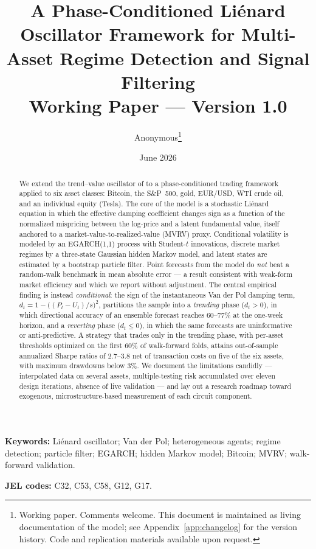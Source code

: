 \documentclass[11pt,a4paper]{article}
\title{\textbf{A Phase-Conditioned Li\'enard Oscillator Framework for Multi-Asset Regime Detection and Signal Filtering}\\[0.5em]
\large Working Paper --- Version 1.0}
\author{Anonymous\thanks{Working paper. Comments welcome. This document is maintained as living documentation of the model; see Appendix~\ref{app:changelog} for the version history. Code and replication materials available upon request.}}
\date{June 2026}
\begin{document}
\maketitle

\begin{abstract}
\noindent
We extend the trend--value oscillator of \citet{majewski2020co} to a phase-conditioned trading framework applied to six asset classes: Bitcoin, the S\&P~500, gold, EUR/USD, WTI crude oil, and an individual equity (Tesla). The core of the model is a stochastic Li\'enard equation in which the effective damping coefficient changes sign as a function of the normalized mispricing between the log-price and a latent fundamental value, itself anchored to a market-value-to-realized-value (MVRV) proxy. Conditional volatility is modeled by an EGARCH(1,1) process with Student-$t$ innovations, discrete market regimes by a three-state Gaussian hidden Markov model, and latent states are estimated by a bootstrap particle filter. Point forecasts from the model do \emph{not} beat a random-walk benchmark in mean absolute error --- a result consistent with weak-form market efficiency and which we report without adjustment. The central empirical finding is instead \emph{conditional}: the sign of the instantaneous Van der Pol damping term, $d_t = 1 - \big((P_t - U_t)/s\big)^2$, partitions the sample into a \emph{trending} phase ($d_t > 0$), in which directional accuracy of an ensemble forecast reaches 60--77\% at the one-week horizon, and a \emph{reverting} phase ($d_t \le 0$), in which the same forecasts are uninformative or anti-predictive. A strategy that trades only in the trending phase, with per-asset thresholds optimized on the first 60\% of walk-forward folds, attains out-of-sample annualized Sharpe ratios of 2.7--3.8 net of transaction costs on five of the six assets, with maximum drawdowns below 3\%. We document the limitations candidly --- interpolated data on several assets, multiple-testing risk accumulated over eleven design iterations, absence of live validation --- and lay out a research roadmap toward exogenous, microstructure-based measurement of each circuit component.
\end{abstract}

\vspace{0.5em}
\noindent\textbf{Keywords:} Li\'enard oscillator; Van der Pol; heterogeneous agents; regime detection; particle filter; EGARCH; hidden Markov model; Bitcoin; MVRV; walk-forward validation.

\noindent\textbf{JEL codes:} C32, C53, C58, G12, G17.
\end{document}
